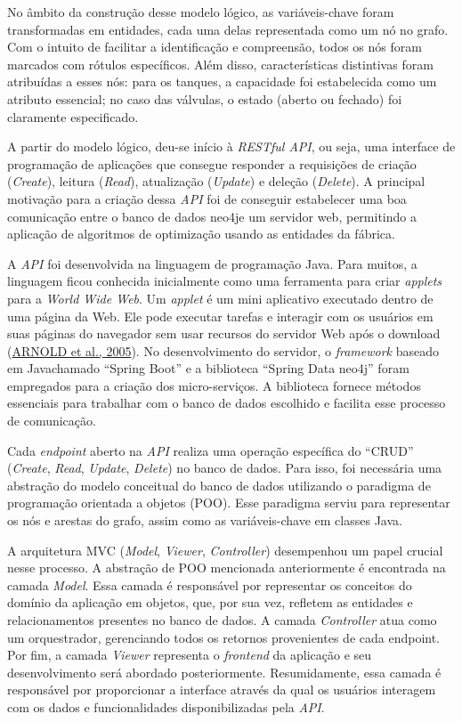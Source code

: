 No âmbito da construção desse modelo lógico, as variáveis-chave foram
transformadas em entidades, cada uma delas representada como um nó no
grafo. Com o intuito de facilitar a identificação e compreensão, todos
os nós foram marcados com rótulos específicos. Além disso,
características distintivas foram atribuídas a esses nós: para os
tanques, a capacidade foi estabelecida como um atributo essencial; no
caso das válvulas, o estado (aberto ou fechado) foi claramente
especificado.

A partir do modelo lógico, deu-se início à \emph{RESTful API}, ou seja,
uma interface de programação de aplicações que consegue responder a
requisições de criação (\emph{Create}), leitura (\emph{Read}),
atualização (\emph{Update}) e deleção (\emph{Delete}). A principal
motivação para a criação dessa \emph{API} foi de conseguir estabelecer
uma boa comunicação entre o banco de dados neo4j\texttrademark e um
servidor web, permitindo a aplicação de algoritmos de optimização usando
as entidades da fábrica.

A \emph{API} foi desenvolvida na linguagem de programação
Java\texttrademark. Para muitos, a linguagem ficou conhecida
inicialmente como uma ferramenta para criar \emph{applets} para a
\emph{World Wide Web}. Um \emph{applet} é um mini aplicativo executado
dentro de uma página da Web. Ele pode executar tarefas e interagir com
os usuários em suas páginas do navegador sem usar recursos do servidor
Web após o download (\hyperref[referuxeancias-bibliogruxe1ficas]{ARNOLD
et al., 2005}). No desenvolvimento do servidor, o \emph{framework}
baseado em Java\texttrademark chamado ``Spring Boot'' e a biblioteca
``Spring Data neo4j'' foram empregados para a criação dos
micro-serviços. A biblioteca fornece métodos essenciais para trabalhar
com o banco de dados escolhido e facilita esse processo de comunicação.

Cada \emph{endpoint} aberto na \emph{API} realiza uma operação
específica do ``CRUD'' (\emph{Create}, \emph{Read}, \emph{Update},
\emph{Delete}) no banco de dados. Para isso, foi necessária uma
abstração do modelo conceitual do banco de dados utilizando o paradigma
de programação orientada a objetos (POO). Esse paradigma serviu para
representar os nós e arestas do grafo, assim como as variáveis-chave em
classes Java\texttrademark.

A arquitetura MVC (\emph{Model}, \emph{Viewer}, \emph{Controller})
desempenhou um papel crucial nesse processo. A abstração de POO
mencionada anteriormente é encontrada na camada \emph{Model}. Essa
camada é responsável por representar os conceitos do domínio da
aplicação em objetos, que, por sua vez, refletem as entidades e
relacionamentos presentes no banco de dados. A camada \emph{Controller}
atua como um orquestrador, gerenciando todos os retornos provenientes de
cada endpoint. Por fim, a camada \emph{Viewer} representa o
\emph{frontend} da aplicação e seu desenvolvimento será abordado
posteriormente. Resumidamente, essa camada é responsável por
proporcionar a interface através da qual os usuários interagem com os
dados e funcionalidades disponibilizadas pela \emph{API}.

